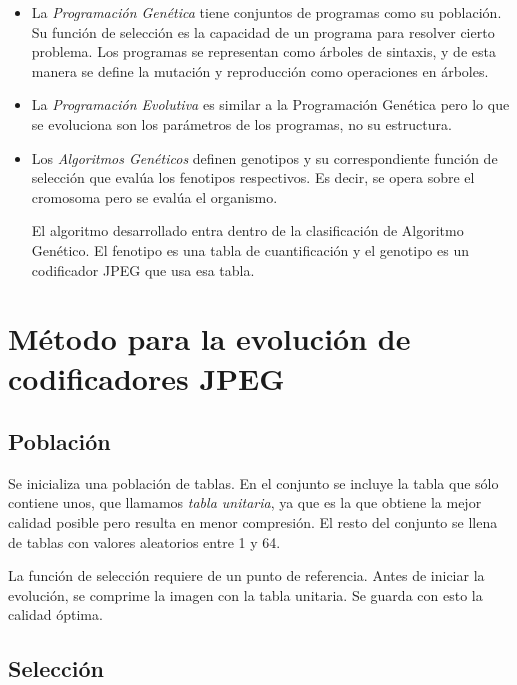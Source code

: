 \begin{itemize}
\item La \emph{Programación Genética} \cite{GenProg} tiene conjuntos de
programas como su población. Su función de selección es la capacidad de un
programa para resolver cierto problema. Los programas se representan como
árboles de sintaxis, y de esta manera se define la mutación y reproducción como
operaciones en árboles.
\item La \emph{Programación Evolutiva} es similar a la Programación Genética
pero lo que se evoluciona son los parámetros de los programas, no su
estructura.
\item Los \emph{Algoritmos Genéticos} definen genotipos y su correspondiente
función de selección que evalúa los fenotipos respectivos. Es decir, se opera
sobre el cromosoma pero se evalúa el organismo.

El algoritmo desarrollado entra dentro de la clasificación de Algoritmo
Genético. El fenotipo es una tabla de cuantificación y el genotipo es un
codificador \gls{JPEG} que usa esa tabla.

\end{itemize}

\section{Método para la evolución de codificadores JPEG}

\subsection{Población}

Se inicializa una población de tablas. En el conjunto se incluye la tabla que
sólo contiene unos, que llamamos \emph{tabla unitaria}, ya que es la que
obtiene la mejor calidad posible pero resulta en menor compresión. El resto del
conjunto se llena de tablas con valores aleatorios entre 1 y 64.

La función de selección requiere de un punto de referencia. Antes de iniciar la
evolución, se comprime la imagen con la tabla unitaria. Se guarda con esto la
calidad óptima.

\subsection{Selección}

